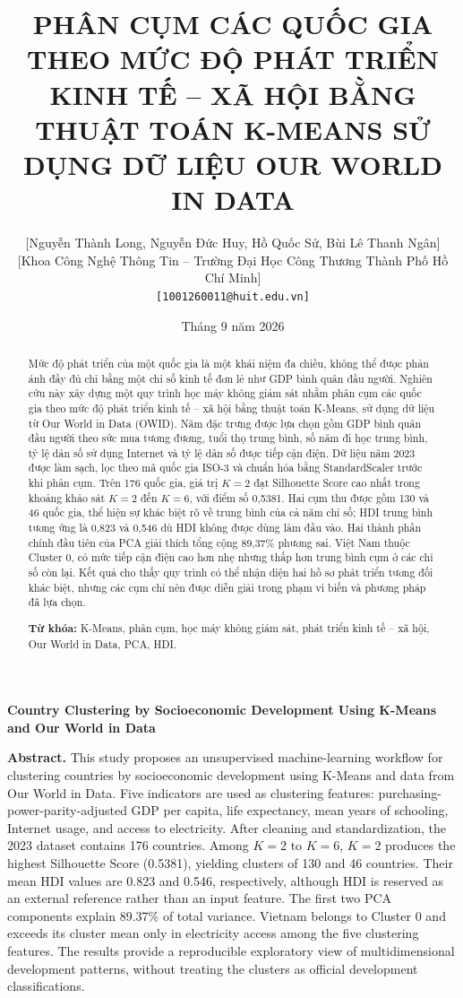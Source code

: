 \documentclass[11pt,a4paper]{article}
\title{\textbf{PHÂN CỤM CÁC QUỐC GIA THEO MỨC ĐỘ PHÁT TRIỂN KINH TẾ -- XÃ HỘI BẰNG THUẬT TOÁN K-MEANS SỬ DỤNG DỮ LIỆU OUR WORLD IN DATA}}
\author{
    {[Nguyễn Thành Long, Nguyễn Đức Huy, Hồ Quốc Sử, Bùi Lê Thanh Ngân]}\\
    {[Khoa Công Nghệ Thông Tin -- Trường Đại Học Công Thương Thành Phố Hồ Chí Minh]}\\
    \texttt{[1001260011@huit.edu.vn]}
}
\date{Tháng 9 năm 2026}
\begin{document}
\maketitle

\begin{abstract}
Mức độ phát triển của một quốc gia là một khái niệm đa chiều, không thể được phản ánh đầy đủ chỉ bằng một chỉ số kinh tế đơn lẻ như GDP bình quân đầu người. Nghiên cứu này xây dựng một quy trình học máy không giám sát nhằm phân cụm các quốc gia theo mức độ phát triển kinh tế -- xã hội bằng thuật toán K-Means, sử dụng dữ liệu từ Our World in Data (OWID). Năm đặc trưng được lựa chọn gồm GDP bình quân đầu người theo sức mua tương đương, tuổi thọ trung bình, số năm đi học trung bình, tỷ lệ dân số sử dụng Internet và tỷ lệ dân số được tiếp cận điện. Dữ liệu năm 2023 được làm sạch, lọc theo mã quốc gia ISO-3 và chuẩn hóa bằng StandardScaler trước khi phân cụm. Trên 176 quốc gia, giá trị $K=2$ đạt Silhouette Score cao nhất trong khoảng khảo sát $K=2$ đến $K=6$, với điểm số 0,5381. Hai cụm thu được gồm 130 và 46 quốc gia, thể hiện sự khác biệt rõ về trung bình của cả năm chỉ số; HDI trung bình tương ứng là 0,823 và 0,546 dù HDI không được dùng làm đầu vào. Hai thành phần chính đầu tiên của PCA giải thích tổng cộng 89,37\% phương sai. Việt Nam thuộc Cluster 0, có mức tiếp cận điện cao hơn nhẹ nhưng thấp hơn trung bình cụm ở các chỉ số còn lại. Kết quả cho thấy quy trình có thể nhận diện hai hồ sơ phát triển tương đối khác biệt, nhưng các cụm chỉ nên được diễn giải trong phạm vi biến và phương pháp đã lựa chọn.

\vspace{0.5em}
\noindent\textbf{Từ khóa:} K-Means, phân cụm, học máy không giám sát, phát triển kinh tế -- xã hội, Our World in Data, PCA, HDI.
\end{abstract}

\begin{center}
\textbf{Country Clustering by Socioeconomic Development Using K-Means and Our World in Data}
\end{center}

\noindent\textbf{Abstract.}
This study proposes an unsupervised machine-learning workflow for clustering countries by socioeconomic development using K-Means and data from Our World in Data. Five indicators are used as clustering features: purchasing-power-parity-adjusted GDP per capita, life expectancy, mean years of schooling, Internet usage, and access to electricity. After cleaning and standardization, the 2023 dataset contains 176 countries. Among $K=2$ to $K=6$, $K=2$ produces the highest Silhouette Score (0.5381), yielding clusters of 130 and 46 countries. Their mean HDI values are 0.823 and 0.546, respectively, although HDI is reserved as an external reference rather than an input feature. The first two PCA components explain 89.37\% of total variance. Vietnam belongs to Cluster 0 and exceeds its cluster mean only in electricity access among the five clustering features. The results provide a reproducible exploratory view of multidimensional development patterns, without treating the clusters as official development classifications.
\end{document}
